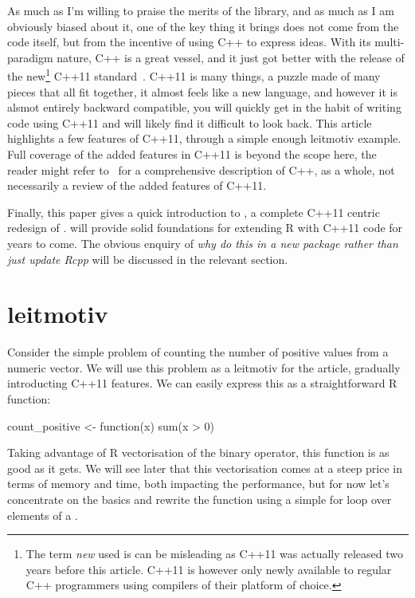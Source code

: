 As much as I'm willing to praise the merits of the  library, and
as much as I am obviously biased about it,
one of the key thing it brings does not come from the code itself, but from
the incentive of using C++ to express ideas. With its multi-paradigm
nature, C++ is a great vessel, and it just got better with the release of the
new\footnote{The term \emph{new} used is can be misleading as
C++11 was actually released two years before this article. C++11 is however
only newly available to regular C++ programmers using compilers of their
platform of choice.} C++11 standard~\citep{Cpp11}. C++11 is many things, a puzzle
made of many pieces that all fit together, it almost feels like a new language,
and however it is alsmot entirely backward compatible, you will quickly get in the
habit of writing code using C++11 and will likely find it difficult to
look back. This article highlights a few features of C++11, through a simple
enough leitmotiv example. Full coverage of the added features in
C++11 is beyond the scope here, the reader might refer to~\citep{Stroustrup2013}
for a comprehensive description of C++, as a whole, not necessarily a review
of the added features of C++11.

Finally, this paper gives a quick introduction to ,
a complete C++11 centric redesign of .  will
provide solid foundations for extending R with C++11 code for years to come.
The obvious enquiry of \emph{why do this in a new package rather than just
update Rcpp} will be discussed in the relevant section.

\section{leitmotiv}

Consider the simple problem of counting the number of positive values
from a numeric vector. We will use this problem as a leitmotiv for the
article, gradually introducting C++11 features.
We can easily express this as a straightforward R function:

\begin{example}
count_positive <- function(x){
  sum(x > 0)
}
\end{example}

Taking advantage of R vectorisation of the \code{>} binary operator, this
function is as good as it gets. We will see later that this vectorisation
comes at a steep price in terms of memory and time, both impacting the
performance, but for now let's concentrate on the basics and
rewrite the function using a simple for loop over elements of a
.

